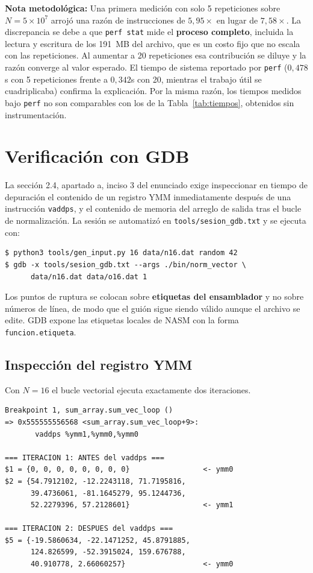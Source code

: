 \documentclass[journal]{IEEEtran}
\begin{document}
\textbf{Nota metodológica:} Una primera medición con solo 5
repeticiones sobre $N = 5\times10^7$ arrojó una razón de instrucciones
de $5,95\times$ en lugar de $7,58\times$. La discrepancia se debe a que
\texttt{perf stat} mide el \textbf{proceso completo}, incluida la lectura y
escritura de los \SI{191}{MB} del archivo, que es un costo fijo que no
escala con las repeticiones. Al aumentar a 20 repeticiones esa
contribución se diluye y la razón converge al valor esperado. El tiempo
de sistema reportado por \texttt{perf} ($0,478$s con 5 repeticiones
frente a $0,342$s con 20, mientras el trabajo útil se
cuadriplicaba) confirma la explicación. Por la misma razón, los
tiempos medidos bajo \texttt{perf} no son comparables con los de la
Tabla~\ref{tab:tiempos}, obtenidos sin instrumentación.

\section{Verificación con GDB}
\label{sec:gdb}

La sección 2.4, apartado a, inciso 3 del enunciado exige inspeccionar en tiempo de
depuración el contenido de un registro YMM inmediatamente después de
una instrucción \texttt{vaddps}, y el contenido de memoria del arreglo de
salida tras el bucle de normalización. La sesión se automatizó en
\texttt{tools/sesion\_gdb.txt} y se ejecuta con:

\begin{lstlisting}[style=shell]
$ python3 tools/gen_input.py 16 data/n16.dat random 42
$ gdb -x tools/sesion_gdb.txt --args ./bin/norm_vector \
      data/n16.dat data/o16.dat 1
\end{lstlisting}

Los puntos de ruptura se colocan sobre \textbf{etiquetas del ensamblador}
y no sobre números de línea, de modo que el guión sigue siendo
válido aunque el archivo se edite. GDB expone las etiquetas locales de
NASM con la forma \texttt{funcion.etiqueta}.

\subsection{Inspección del registro YMM}

Con $N = 16$ el bucle vectorial ejecuta exactamente dos iteraciones.

\begin{lstlisting}[style=shell,caption={Contenido de \texttt{ymm0} antes y
  después del \texttt{vaddps}.}, label={lst:gdb-ymm}]
Breakpoint 1, sum_array.sum_vec_loop ()
=> 0x555555556568 <sum_array.sum_vec_loop+9>:
       vaddps %ymm1,%ymm0,%ymm0

=== ITERACION 1: ANTES del vaddps ===
$1 = {0, 0, 0, 0, 0, 0, 0, 0}                 <- ymm0
$2 = {54.7912102, -12.2243118, 71.7195816,
      39.4736061, -81.1645279, 95.1244736,
      52.2279396, 57.2128601}                 <- ymm1

=== ITERACION 2: DESPUES del vaddps ===
$5 = {-19.5860634, -22.1471252, 45.8791885,
      124.826599, -52.3915024, 159.676788,
      40.910778, 2.66060257}                  <- ymm0
\end{lstlisting}
\end{document}
